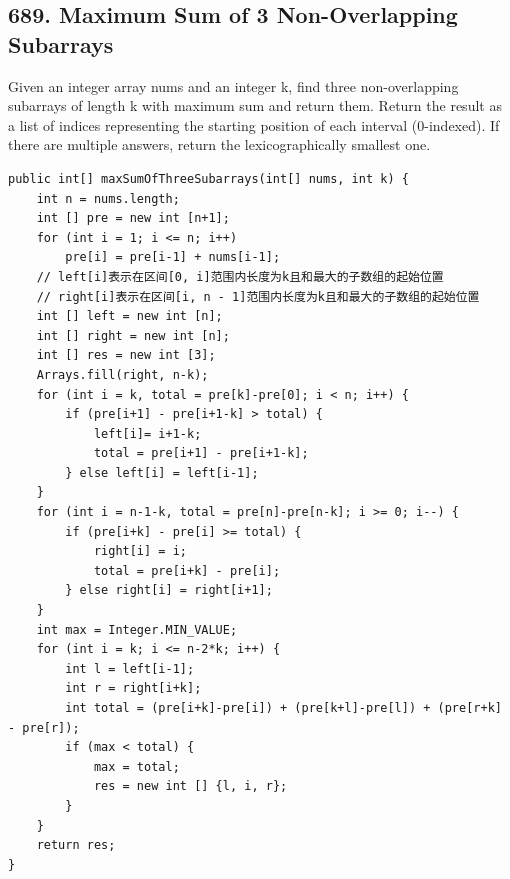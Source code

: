 \documentclass[9pt, b5paaper]{book}
\begin{document}
\subsection{689. Maximum Sum of 3 Non-Overlapping Subarrays}
\label{sec-1-4-46}
Given an integer array nums and an integer k, find three non-overlapping subarrays of length k with maximum sum and return them.
Return the result as a list of indices representing the starting position of each interval (0-indexed). If there are multiple answers, return the lexicographically smallest one.
\begin{verbatim}
public int[] maxSumOfThreeSubarrays(int[] nums, int k) {
    int n = nums.length;
    int [] pre = new int [n+1];
    for (int i = 1; i <= n; i++) 
        pre[i] = pre[i-1] + nums[i-1];
    // left[i]表示在区间[0, i]范围内长度为k且和最大的子数组的起始位置
    // right[i]表示在区间[i, n - 1]范围内长度为k且和最大的子数组的起始位置
    int [] left = new int [n];
    int [] right = new int [n];
    int [] res = new int [3];
    Arrays.fill(right, n-k);
    for (int i = k, total = pre[k]-pre[0]; i < n; i++) {
        if (pre[i+1] - pre[i+1-k] > total) {
            left[i]= i+1-k;
            total = pre[i+1] - pre[i+1-k];
        } else left[i] = left[i-1];
    }
    for (int i = n-1-k, total = pre[n]-pre[n-k]; i >= 0; i--) {
        if (pre[i+k] - pre[i] >= total) {
            right[i] = i;
            total = pre[i+k] - pre[i];
        } else right[i] = right[i+1];
    }
    int max = Integer.MIN_VALUE;
    for (int i = k; i <= n-2*k; i++) {
        int l = left[i-1];
        int r = right[i+k];
        int total = (pre[i+k]-pre[i]) + (pre[k+l]-pre[l]) + (pre[r+k] - pre[r]);
        if (max < total) {
            max = total;
            res = new int [] {l, i, r};
        }
    }
    return res;
}
\end{verbatim}
\end{document}
